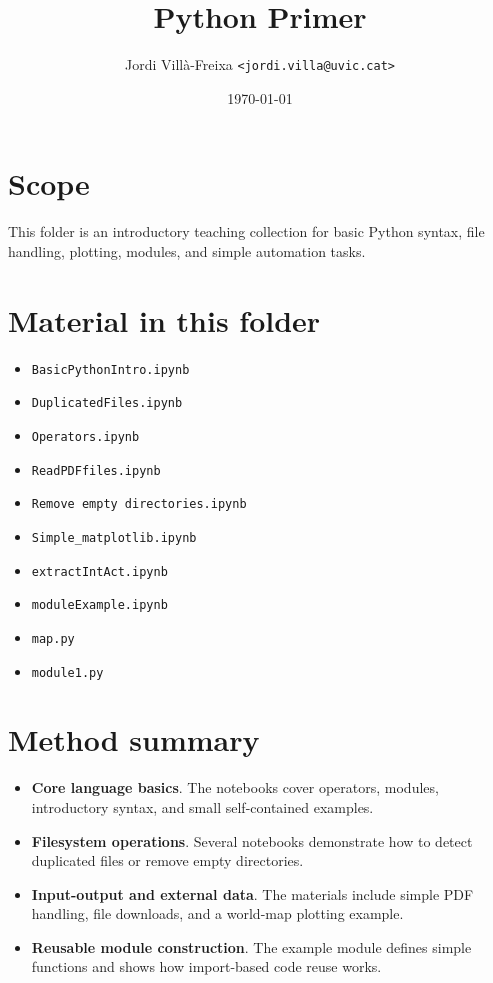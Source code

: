 \documentclass[11pt,a4paper]{article}
\title{Python Primer}
\author{Jordi Vill\`a-Freixa \texttt{<jordi.villa@uvic.cat>}}
\date{\today}
\begin{document}
    \maketitle

    \section*{Scope}
    This folder is an introductory teaching collection for basic Python syntax, file handling, plotting, modules, and simple automation tasks.

    \section*{Material in this folder}
    \begin{itemize}[leftmargin=*]
\item \texttt{BasicPythonIntro.ipynb}
\item \texttt{DuplicatedFiles.ipynb}
\item \texttt{Operators.ipynb}
\item \texttt{ReadPDFfiles.ipynb}
\item \texttt{Remove empty directories.ipynb}
\item \texttt{Simple\_matplotlib.ipynb}
\item \texttt{extractIntAct.ipynb}
\item \texttt{moduleExample.ipynb}
\item \texttt{map.py}
\item \texttt{module1.py}
    \end{itemize}

    \section*{Method summary}
    \begin{itemize}[leftmargin=*]
\item \textbf{Core language basics}. The notebooks cover operators, modules, introductory syntax, and small self-contained examples.
\item \textbf{Filesystem operations}. Several notebooks demonstrate how to detect duplicated files or remove empty directories.
\item \textbf{Input-output and external data}. The materials include simple PDF handling, file downloads, and a world-map plotting example.
\item \textbf{Reusable module construction}. The example module defines simple functions and shows how import-based code reuse works.
    \end{itemize}
\end{document}
